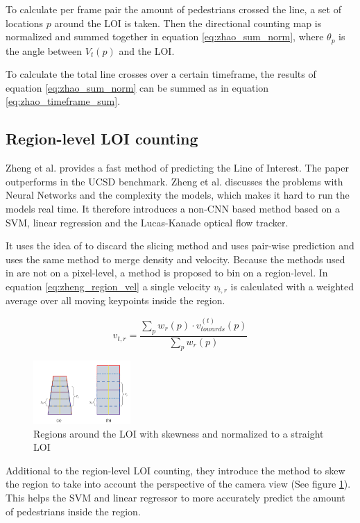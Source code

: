 To calculate per frame pair the amount of pedestrians crossed the line, a set of locations $p$ around the LOI is taken. Then the directional counting map is normalized and summed together in equation \ref{eq:zhao_sum_norm}, where $\theta_p$ is the angle between $V_t(p)$ and the LOI.

To calculate the total line crosses over a certain timeframe, the results of equation \ref{eq:zhao_sum_norm} can be summed as in equation \ref{eq:zhao_timeframe_sum}.


\subsection{Region-level LOI counting}
Zheng et al. \cite{zheng_cross-line_2019} provides a fast method of predicting the Line of Interest. The paper outperforms \cite{leibe_crossing-line_2016} in the UCSD benchmark. Zheng et al. discusses the problems with Neural Networks and the complexity the models, which makes it hard to run the models real time. It therefore introduces a non-CNN based method based on a SVM, linear regression and the Lucas-Kanade optical flow tracker.

It uses the idea of \cite{leibe_crossing-line_2016} to discard the slicing method and uses pair-wise prediction and uses the same method to merge density and velocity. Because the methods used in \cite{zheng_cross-line_2019} are not on a pixel-level, a method is proposed to bin on a region-level. In equation \ref{eq:zheng_region_vel} a single velocity $v_{t,r}$ is calculated with a weighted average over all moving keypoints inside the region.

\begin{equation}
	v_{t,r} = \frac{\sum_p w_r(p) \cdot v^{(t)}_{towards}(p)}{\sum_p w_r(p)}
	\label{eq:zheng_region_vel}
\end{equation}

\begin{figure}[h]
\centering
\includegraphics[width=0.33\textwidth]{images/zheng19_regions}
\caption{Regions around the LOI with skewness and normalized to a straight LOI}
\label{fig:zheng_skew}
\end{figure}

Additional to the region-level LOI counting, they introduce the method to skew the region to take into account the perspective of the camera view (See figure \ref{fig:zheng_skew}). This helps the SVM and linear regressor to more accurately predict the amount of pedestrians inside the region.
